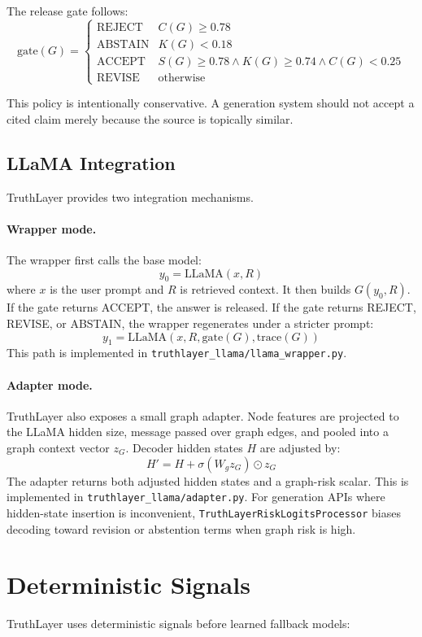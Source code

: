 \documentclass[11pt]{article}
\begin{document}
The release gate follows:
\[
\text{gate}(G)=
\begin{cases}
\text{REJECT} & C(G) \geq 0.78 \\
\text{ABSTAIN} & K(G) < 0.18 \\
\text{ACCEPT} & S(G) \geq 0.78 \land K(G) \geq 0.74 \land C(G) < 0.25 \\
\text{REVISE} & \text{otherwise}
\end{cases}
\]

This policy is intentionally conservative. A generation system should not accept a cited claim merely because the source is topically similar.

\subsection{LLaMA Integration}
TruthLayer provides two integration mechanisms.

\paragraph{Wrapper mode.}
The wrapper first calls the base model:
\[
y_0 = \text{LLaMA}(x, R)
\]
where $x$ is the user prompt and $R$ is retrieved context. It then builds $G(y_0, R)$. If the gate returns ACCEPT, the answer is released. If the gate returns REJECT, REVISE, or ABSTAIN, the wrapper regenerates under a stricter prompt:
\[
y_1 = \text{LLaMA}(x, R, \text{gate}(G), \text{trace}(G))
\]
This path is implemented in \texttt{truthlayer\_llama/llama\_wrapper.py}.

\paragraph{Adapter mode.}
TruthLayer also exposes a small graph adapter. Node features are projected to the LLaMA hidden size, message passed over graph edges, and pooled into a graph context vector $z_G$. Decoder hidden states $H$ are adjusted by:
\[
H' = H + \sigma(W_g z_G) \odot z_G
\]
The adapter returns both adjusted hidden states and a graph-risk scalar. This is implemented in \texttt{truthlayer\_llama/adapter.py}. For generation APIs where hidden-state insertion is inconvenient, \texttt{TruthLayerRiskLogitsProcessor} biases decoding toward revision or abstention terms when graph risk is high.

\section{Deterministic Signals}
TruthLayer uses deterministic signals before learned fallback models:
\end{document}
